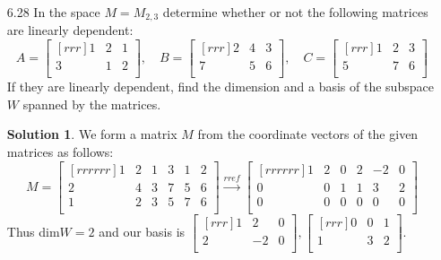 \documentclass[12pt]{article}
\theoremstyle{definition}
\newtheorem*{solution}{Solution} %
\theoremstyle{plain}
\begin{document}
\begin{enumerate}
\begin{enumerate}
\begin{align*}
		&=\begin{bmatrix}[rr]x+y+z+t & x-y+z\\ x+y & x\\\end{bmatrix}\\
		&x+y+z+t = 3, \quad x-y+z = -5, \quad x+y = 6, \quad x = 7
		\end{align*}
		The solution to this system is $x=7, y=-1, z=-13, t=10$. Thus $[A]=[7,-1,-13,10]$.
	\item
		Using the resulting matrix from the previous question gives us the following system
		\[ \sysdelim{.}{.}\systeme[xyzt]{a=x+y+z+t,b=x-y+z,c=x+y,d=x} \]
		The solution to this system is $x=d, y=c-d, z=(b-d)+(c-d), t= (a-d)-(c-d)-((b-d)+(c-d))$. Thus $[A]=[d,c-d,b+c-2d,a-b-2c+2d]$.
	\end{enumerate}

\pagebreak
\item[6.28] In the space $M=M_{2,3}$ determine whether or not the following matrices are linearly dependent:
\[ A=\begin{bmatrix}[rrr]1&2&1\\3&1&2\\\end{bmatrix}, \quad B=\begin{bmatrix}[rrr]2&4&3\\7&5&6\\\end{bmatrix}, \quad C=\begin{bmatrix}[rrr]1&2&3\\5&7&6\\\end{bmatrix} \]
If they are linearly dependent, find the dimension and a basis of the subspace $W$ spanned by the matrices.
	\begin{solution}
	We form a matrix $M$ from the coordinate vectors of the given matrices as follows:
	\[ M=\begin{bmatrix}[rrrrrr]1&2&1&3&1&2\\2&4&3&7&5&6\\1&2&3&5&7&6\\\end{bmatrix} \xrightarrow[]{rref} \begin{bmatrix}[rrrrrr]1&2&0&2&-2&0\\0&0&1&1&3&2\\0&0&0&0&0&0\\\end{bmatrix}\]
	Thus dim$W=2$ and our basis is $\begin{bmatrix}[rrr]1&2&0\\2&-2&0\\\end{bmatrix},\begin{bmatrix}[rrr]0&0&1\\1&3&2\\\end{bmatrix}$.
	\end{solution}


\end{enumerate}
\end{document}
